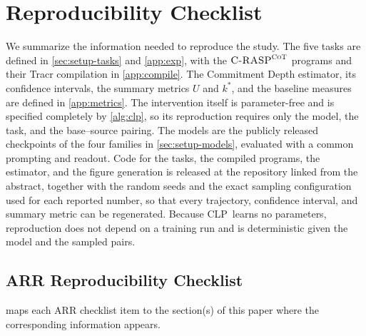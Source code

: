 \documentclass[11pt]{article}
\newcommand{\stepk}{k}
\newcommand{\CLP}{\textsc{CLP}}
\newcommand{\CRASPCoT}{\textsc{C-RASP}^{\textsc{CoT}}}
\begin{document}
\section{Reproducibility Checklist}
\label{app:checklist}

We summarize the information needed to reproduce the study. The five tasks are
defined in \cref{sec:setup-tasks} and \cref{app:exp}, with the $\CRASPCoT$
programs and their Tracr compilation in \cref{app:compile}. The Commitment Depth
estimator, its confidence intervals, the summary metrics $U$ and $\stepk^{*}$,
and the baseline measures are defined in \cref{app:metrics}. The intervention
itself is parameter-free and is specified completely by \cref{alg:clp}, so its
reproduction requires only the model, the task, and the base--source pairing.
The models are the publicly released checkpoints of the four families in
\cref{sec:setup-models}, evaluated with a common prompting and readout. Code for
the tasks, the compiled programs, the estimator, and the figure generation is
released at the repository linked from the abstract, together with the random
seeds and the exact sampling configuration used for each reported number, so
that every trajectory, confidence interval, and summary metric can be
regenerated. Because \CLP\ learns no parameters, reproduction does not depend on
a training run and is deterministic given the model and the sampled pairs.

\subsection{ARR Reproducibility Checklist}
\label{app:checklist-arr}

 maps each ARR checklist item to the section(s) of this
paper where the corresponding information appears.
\end{document}
